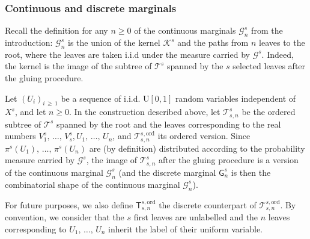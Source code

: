 \documentclass[10pt]{amsart}
\theoremstyle{definition}\newtheorem{defi}[theo]{Definition}\newtheorem{rema}[theo]{Remark}\newtheorem{exam}[theo]{Example}\newtheorem{exem}[theo]{Example}\newtheorem{nota}[theo]{Notation}
\newcommand{\ord}{\mathrm{ord}}
\newcommand{\rmU}{\mathrm{U}}
\newcommand{\cG}{\mathcal{G}}
\newcommand{\cT}{\mathcal{T}}
\newcommand{\cK}{\mathcal{K}}
\newcommand{\sG}{\mathsf{G}}
\newcommand{\sT}{\mathsf{T}}
\begin{document}
\subsubsection{Continuous and discrete marginals} Recall the definition for any $n\geq 0$ of the continuous marginals $\cG_n^s$ from the introduction: $\cG_n^s$ is the union of the kernel $\cK^s$ and the paths from $n$ leaves to the root, where the leaves are taken i.i.d under the measure carried by $\cG^s$. Indeed, the kernel is the image of the subtree of $\cT^s$ spanned by the $s$ selected leaves after the gluing procedure.

Let $(U_i)_{i\,\geq\,1}$ be a sequence of i.i.d. $\rmU[0,1]$ random variables independent of $X^s$, and let $n\geq 0$. In the construction described above, let $\cT_{s,n}^{s}$ be the ordered subtree of $\cT^s$ spanned by the root and the leaves corresponding to the real numbers $V^s_1,\,\dots,\,V_s^s,U_1,\,\dots,\, U_n$, and $\cT_{s,n}^{s,\ord}$ its ordered version. Since $\pi^s(U_1),\,\dots,\, \pi^s(U_n)$ are (by definition) distributed according to the probability measure carried by $\cG^s$, the image of $\cT_{s,n}^s$ after the gluing procedure is a version of the continuous marginal $\cG_n^s$ (and the discrete marginal $\sG_n^s$ is then the combinatorial shape of the continuous marginal $\cG_n^s$).

For future purposes, we also define $\sT_{s,n}^{s,\ord}$ the discrete counterpart of $\cT_{s,n}^{s,\ord}$. By convention, we consider that the $s$ first leaves are unlabelled and the $n$ leaves corresponding to $U_1,\,\dots,\,U_n$ inherit the label of their uniform variable.
\end{document}
